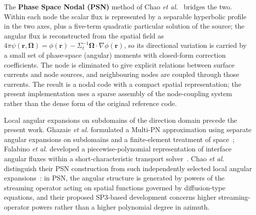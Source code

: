 \documentclass[11pt,a4paper]{article}
\begin{document}
The \textbf{Phase Space Nodal (PSN)} method of Chao
\emph{et al.}~\cite{psn2027} bridges the two. Within each node the scalar
flux is represented by a separable hyperbolic profile in the two axes, plus a
five-term quadratic particular solution of the source; the angular flux is
reconstructed from the spatial field as
$4\pi\psi(\mathbf{r},\boldsymbol{\Omega})
=\phi(\mathbf{r})-\Sigma_t^{-1}\boldsymbol{\Omega}\cdot\nabla\phi
(\mathbf{r})$, so its directional variation is carried by a small set of
phase-space (angular) moments with closed-form correction coefficients. The
node is eliminated to give explicit relations between surface currents and
node sources, and neighbouring nodes are coupled through those currents. The
result is a nodal code with a compact spatial representation; the present
implementation uses a sparse assembly of the node-coupling system rather than
the dense form of the original reference code.

Local angular expansions on subdomains of the direction domain
precede the present work. Ghazaie \emph{et al.} formulated a Multi-PN
approximation using separate angular expansions on subdomains and a
finite-element treatment of space~\cite{ghazaie2019mpn}; Falabino
\emph{et al.} developed a piecewise-polynomial representation of
interface angular fluxes within a short-characteristic transport
solver~\cite{falabino2022mpn}. Chao \emph{et al.} distinguish their PSN
construction from such independently selected local angular
expansions~\cite{psn2027}: in PSN, the angular structure is generated by
powers of the streaming operator acting on spatial functions governed by
diffusion-type equations, and their proposed SP3-based development
concerns higher streaming-operator powers rather than a higher polynomial
degree in azimuth.
\end{document}
